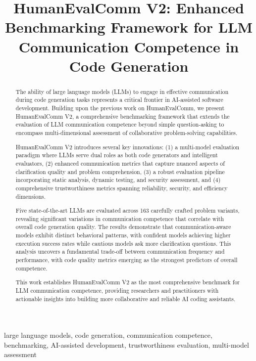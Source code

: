 \documentclass[conference]{IEEEtran}
\title{HumanEvalComm V2: Enhanced Benchmarking Framework for LLM Communication Competence in Code Generation}
\begin{document}
\maketitle

\begin{abstract}
The ability of large language models (LLMs) to engage in effective communication during code generation tasks represents a critical frontier in AI-assisted software development. Building upon the previous work on HumanEvalComm, we present HumanEvalComm V2, a comprehensive benchmarking framework that extends the evaluation of LLM communication competence beyond simple question-asking to encompass multi-dimensional assessment of collaborative problem-solving capabilities.

HumanEvalComm V2 introduces several key innovations: (1) a multi-model evaluation paradigm where LLMs serve dual roles as both code generators and intelligent evaluators, (2) enhanced communication metrics that capture nuanced aspects of clarification quality and problem comprehension, (3) a robust evaluation pipeline incorporating static analysis, dynamic testing, and security assessment, and (4) comprehensive trustworthiness metrics spanning reliability, security, and efficiency dimensions.

Five state-of-the-art LLMs are evaluated across 163 carefully crafted problem variants, revealing significant variations in communication competence that correlate with overall code generation quality. The results demonstrate that communication-aware models exhibit distinct behavioral patterns, with confident models achieving higher execution success rates while cautious models ask more clarification questions. This analysis uncovers a fundamental trade-off between communication frequency and performance, with code quality metrics emerging as the strongest predictors of overall competence.

This work establishes HumanEvalComm V2 as the most comprehensive benchmark for LLM communication competence, providing researchers and practitioners with actionable insights into building more collaborative and reliable AI coding assistants.
\end{abstract}

\begin{IEEEkeywords}
large language models, code generation, communication competence, benchmarking, AI-assisted development, trustworthiness evaluation, multi-model assessment
\end{IEEEkeywords}
\end{document}
